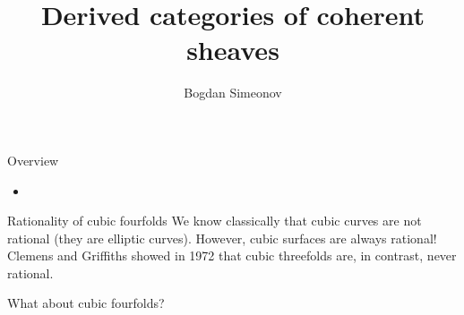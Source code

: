 \documentclass[10pt]{beamer}
\title{Derived categories of coherent sheaves}
\date{}
\author{Bogdan Simeonov}
\begin{document}
\maketitle

\begin{frame}{Overview}
    \begin{itemize}
        \pause
        \item 
    \end{itemize}
 
\end{frame}

\begin{frame}{Rationality of cubic fourfolds}
    We know classically that cubic curves are not rational (they are elliptic curves). However, cubic surfaces are always rational! Clemens and Griffiths showed in 1972 that cubic threefolds are, in contrast, never rational.

    What about cubic fourfolds?
\end{frame}
\end{document}
